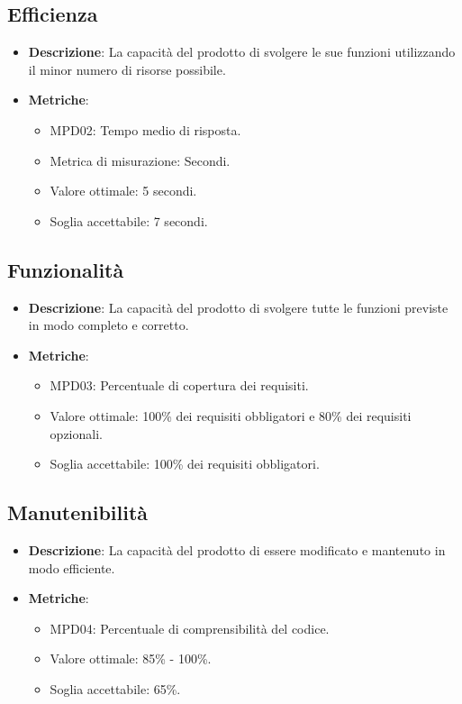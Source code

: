 \documentclass[12pt]{article}
\begin{document}
\subsection{Efficienza}
\begin{itemize}
	\item \textbf{Descrizione}: La capacità del prodotto di svolgere le sue funzioni utilizzando il minor numero di risorse possibile.
	\item \textbf{Metriche}:
	      \begin{itemize}
		      \item MPD02: Tempo medio di risposta.
		      \item Metrica di misurazione: Secondi.
		      \item Valore ottimale: 5 secondi.
		      \item Soglia accettabile: 7 secondi.
	      \end{itemize}
\end{itemize}

\subsection{Funzionalità}
\begin{itemize}
	\item \textbf{Descrizione}: La capacità del prodotto di svolgere tutte le funzioni previste in modo completo e corretto.
	\item \textbf{Metriche}:
	      \begin{itemize}
		      \item MPD03: Percentuale di copertura dei requisiti.
		      \item Valore ottimale: 100\% dei requisiti obbligatori e 80\% dei requisiti opzionali.
		      \item Soglia accettabile: 100\% dei requisiti obbligatori.
	      \end{itemize}
\end{itemize}

\subsection{Manutenibilità}
\begin{itemize}
	\item \textbf{Descrizione}: La capacità del prodotto di essere modificato e mantenuto in modo efficiente.
	\item \textbf{Metriche}:
	      \begin{itemize}
		      \item MPD04: Percentuale di comprensibilità del codice.
		      \item Valore ottimale: 85\% - 100\%.
		      \item Soglia accettabile: 65\%.
	      \end{itemize}
\end{itemize}
\end{document}
